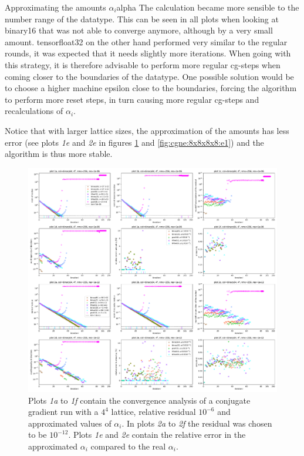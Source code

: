\documentclass{article}
\theoremstyle{plain} %
\theoremstyle{convention} %
\theoremstyle{remark} %
\numberwithin{equation}{section}
\begin{document}
\begin{proposal}{Approximating the amounts $\alpha_i$}{alpha}
The calculation became more sensible to the number range of the datatype. This can be seen in all plots when looking at \gls{binary16} that was not able to converge anymore, although by a very small amount. \gls{tensorfloat32} on the other hand performed very similar to the regular rounds, it was expected that it needs slightly more iterations. When going with this strategy, it is therefore advisable to perform more regular cg-steps when coming closer to the boundaries of the datatype. One possible solution would be to choose a higher machine epsilon close to the boundaries, forcing the algorithm to perform more reset steps, in turn causing more regular cg-steps and recalculations of $\alpha_i$.

Notice that with larger lattice sizes, the approximation of the amounts has less error (see plots \textit{1e} and \textit{2e} in figures \ref{fig:cgne:4x4x4x4:e1} and \ref{fig:cgne:8x8x8x8:e1}) and the algorithm is thus more stable.

\end{proposal}

\begin{figure}
    \centering
    \includegraphics[width=1.0\textwidth]{plots/cgne_4x4x4x4_e1}
    \caption{Plots \textit{1a} to \textit{1f} contain the convergence analysis of a conjugate gradient run with a $4^4$ lattice, relative residual $10^{-6}$ and approximated values of $\alpha_i$. In plots \textit{2a} to \textit{2f} the residual was chosen to be $10^{-12}$. Plots \textit{1e} and \textit{2e} contain the relative error in the approximated $\alpha_i$ compared to the real $\alpha_i$.}
    \label{fig:cgne:4x4x4x4:e1}
\end{figure}
\end{document}
